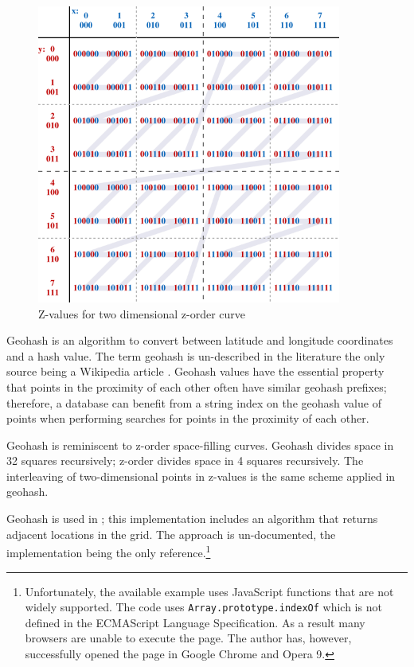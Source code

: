 \begin{figure}[htbp]
  \centering
  \includegraphics[width=10cm]{./Figures/z-order}
  \caption{Z-values for two dimensional z-order curve \citep{wiki:z_order}}
  \label{fig:z_order}
\end{figure}

Geohash is an algorithm to convert between latitude and longitude coordinates and
a hash value. The term geohash is un-described in the literature the only source
being a Wikipedia article \citep{wiki:geohash}. Geohash values have the essential
property that points in the proximity of each other often have similar geohash
prefixes; therefore, a database can benefit from a string index on the geohash
value of points when performing searches for points in the proximity of each
other.

Geohash is reminiscent to z-order space-filling curves. Geohash divides space in
32 squares recursively; z-order divides space in 4 squares recursively. The
interleaving of two-dimensional points in z-values is the same scheme applied
in geohash.

Geohash is used in \citep{geohash:neighbors}; this implementation includes an
algorithm that returns adjacent locations in the grid. The approach is
un-documented, the implementation being the only
reference.\footnote{Unfortunately, the available example uses JavaScript
functions that are not widely supported. The code uses
\verb+Array.prototype.indexOf+ which is not defined in the ECMAScript Language
Specification. As a result many browsers are unable to execute the
page. The author has, however, successfully opened the page in Google Chrome and
Opera 9.}

